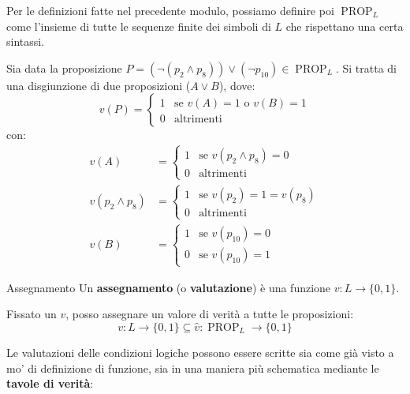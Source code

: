 \documentclass[12pt]{report}
\begin{document}
	Per le definizioni fatte nel precedente modulo, possiamo definire poi $\operatorname{PROP}_L$ come l'insieme di tutte le sequenze finite dei simboli di $L$ che rispettano una certa sintassi.
	
	Sia data la proposizione $P = (\neg(p_2 \land p_8)) \lor (\neg p_{10}) \in \operatorname{PROP}_L$.
	Si tratta di una disgiunzione di due proposizioni ($A \lor B$), dove:
	\[
	v(P) = \begin{cases} 1 & \text{se } v(A) = 1 \text{ o } v(B) = 1 \\ 0 & \text{altrimenti} \end{cases}
	\]
	con:
	\begin{align*}
		v(A) &= \begin{cases} 1 & \text{se } v(p_2 \land p_8) = 0 \\ 0 & \text{altrimenti} \end{cases} \\
		v(p_2 \land p_8) &= \begin{cases} 1 & \text{se } v(p_2) = 1 = v(p_8) \\ 0 & \text{altrimenti} \end{cases} \\
		v(B) &= \begin{cases} 1 & \text{se } v(p_{10}) = 0 \\ 0 & \text{se } v(p_{10}) = 1 \end{cases}
	\end{align*}
	
	\begin{definizione}{Assegnamento}{}
		Un \textbf{assegnamento} (o \textbf{valutazione}) è una funzione $v: L \to \{0, 1\}$.
	\end{definizione}
	
	Fissato un $v$, posso assegnare un valore di verità a tutte le proposizioni:
	\[
	v: L \to \{0, 1\} \subseteq \hat{v}: \operatorname{PROP}_L \to \{0, 1\}
	\]
	
	Le valutazioni delle condizioni logiche possono essere scritte sia come già visto a mo' di definizione di funzione, sia in una maniera più schematica mediante le \textbf{tavole di verità}:
	
\end{document}
